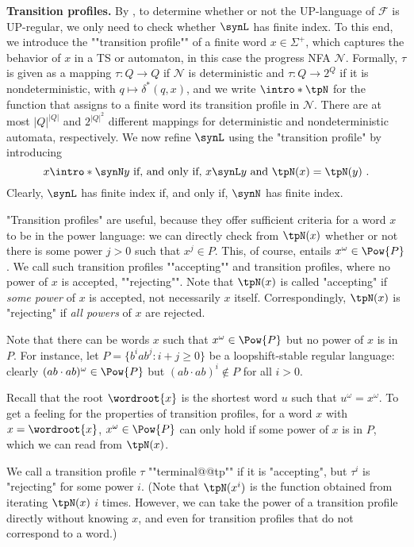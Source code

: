 \documentclass[a4paper,USenglish,cleveref,autoref,thm-restate]{lipics-v2021}
\newcommand{\mc}[1]{\ensuremath{\mathcal{#1}}}
\newcommand{\F}{\mc{F}}
\newcommand{\N}{\mc{N}}
\begin{document}
\noindent\textbf{Transition profiles.}
\AP
By , to determine whether or not the UP-language of $\F$ is UP-regular, we only need to check whether $\synL$ has finite index.
To this end, we introduce the ""transition profile"" of a finite word $x \in \Sigma^+$, which captures the behavior of $x$ in a TS or automaton, in this case the progress NFA $\N$.
Formally, $\tau$ is given as a mapping $\tau : Q \to Q$ if $\N$ is deterministic and $\tau : Q \to 2^Q$ if it is nondeterministic, with $q \mapsto \delta^*(q, x)$, and we write $\intro*\tpN$ for the function that assigns to a finite word its transition profile in $\N$.
There are at most $|Q|^{|Q|}$ and $2^{|Q|^2}$ different mappings for deterministic and nondeterministic automata, respectively.
\AP
We now refine $\synL$ using the "transition profile" by introducing
\[x \intro*\synN y \text{ if, and only if, }  x \synL y \text{ and } \tpN(x) = \tpN(y)\ .\]
Clearly, $\synL$ has finite index if, and only if, $\synN$ has finite index.

"Transition profiles" are useful, because they offer sufficient criteria for a word $x$ to be in the power language: we can directly check from $\tpN(x)$ whether or not there is some power $j>0$ such that $x^j \in P$.
This, of course, entails $x^\omega \in \Pow{P}$.
We call such transition profiles \AP ""accepting"" and transition profiles, where no power of $x$ is accepted, ""rejecting"". Note that $\tpN(x)$ is called "accepting" if \textit{some power} of $x$ is accepted, not necessarily $x$ itself. Correspondingly,  $\tpN(x)$ is "rejecting" if \emph{all powers} of $x$ are rejected.

Note that there can be words $x$ such that $x^\omega \in \Pow{P}$ but no power of $x$ is in $P$.
For instance, let $P = \{b^iab^j : i+j \geq 0\}$
be a loopshift-stable regular language:
clearly $(ab\cdot ab)^{\omega} \in \Pow{P}$ but $(ab \cdot ab)^i \notin P$ for all $i > 0$.

Recall that the root $\wordroot{x}$ is the shortest word $u$ such that $u^{\omega}  = x^\omega$.
To get a feeling for the properties of transition profiles, for a word $x$ with $x=\wordroot{x}$, $x^\omega \in \Pow{P}$ can only hold if some power of $x$ is in $P$, which we can read from $\tpN(x)$.

\AP
We call a transition profile $\tau$ ""terminal@@tp"" if it is "accepting", but $\tau^i$ is "rejecting" for some power $i$.
(Note that $\tpN(x^i)$ is the function obtained from iterating $\tpN(x)$ $i$ times. However, we can take the power of a transition profile directly without knowing $x$, and even for transition profiles that do not correspond to a word.)
\end{document}
